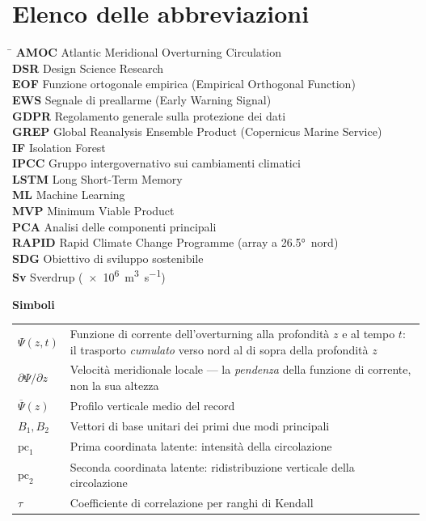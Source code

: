 \chapter*{Elenco delle abbreviazioni}

\begin{tabbing}
\hspace{3.5cm} \= \kill
\textbf{AMOC} \> Atlantic Meridional Overturning Circulation \\
\textbf{DSR} \> Design Science Research \\
\textbf{EOF} \> Funzione ortogonale empirica (Empirical Orthogonal Function) \\
\textbf{EWS} \> Segnale di preallarme (Early Warning Signal) \\
\textbf{GDPR} \> Regolamento generale sulla protezione dei dati \\
\textbf{GREP} \> Global Reanalysis Ensemble Product (Copernicus Marine Service) \\
\textbf{IF} \> Isolation Forest \\
\textbf{IPCC} \> Gruppo intergovernativo sui cambiamenti climatici \\
\textbf{LSTM} \> Long Short-Term Memory \\
\textbf{ML} \> Machine Learning \\
\textbf{MVP} \> Minimum Viable Product \\
\textbf{PCA} \> Analisi delle componenti principali \\
\textbf{RAPID} \> Rapid Climate Change Programme (array a \ang{26.5}~nord) \\
\textbf{SDG} \> Obiettivo di sviluppo sostenibile \\
\textbf{Sv} \> Sverdrup (\SI{e6}{\cubic\metre\per\second}) \\
\end{tabbing}

\vspace{1cm}

\noindent\textbf{Simboli}

\vspace{0.3cm}

\begin{tabularx}{\textwidth}{@{}p{3cm} X@{}}
$\Psi(z,t)$ & Funzione di corrente dell'overturning alla profondità $z$ e al tempo $t$: il trasporto \emph{cumulato} verso nord al di sopra della profondità $z$ \\[3pt]
$\partial\Psi/\partial z$ & Velocità meridionale locale --- la \emph{pendenza} della funzione di corrente, non la sua altezza \\[3pt]
$\overline{\Psi}(z)$ & Profilo verticale medio del record \\[3pt]
$B_1, B_2$ & Vettori di base unitari dei primi due modi principali \\[3pt]
$\mathrm{pc}_1$ & Prima coordinata latente: intensità della circolazione \\[3pt]
$\mathrm{pc}_2$ & Seconda coordinata latente: ridistribuzione verticale della circolazione \\[3pt]
$\tau$ & Coefficiente di correlazione per ranghi di Kendall \\
\end{tabularx}

\cleardoublepage
